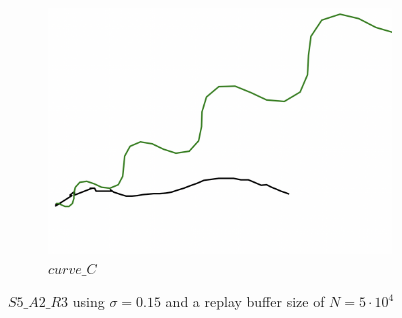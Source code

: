 \begin{figure}[H]
\begin{subfigure}[b]{0.31\textwidth}
         \includegraphics[width=\textwidth]{images/ddpg_results/envs_S3_S4_S5/S5_A2_R3_curve_C.png}
         \caption{$curve\_C$}
     \end{subfigure}
        \caption{$S5\_A2\_R3$ using $\sigma=0.15$ and a replay buffer size of $N=5\cdot 10^4$}
        \label{fig:advCurves3}
\end{figure}

